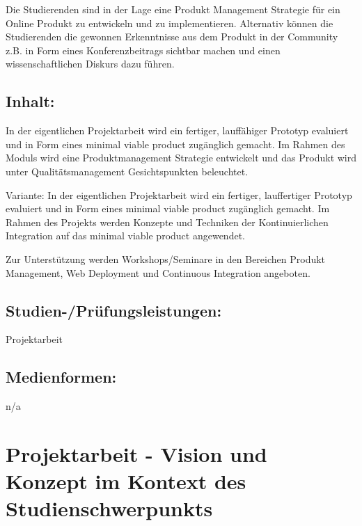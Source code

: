 Die Studierenden sind in der Lage eine Produkt Management Strategie für
ein Online Produkt zu entwickeln und zu implementieren. Alternativ
können die Studierenden die gewonnen Erkenntnisse aus dem Produkt in der
Community z.B. in Form eines Konferenzbeitrags sichtbar machen und einen
wissenschaftlichen Diskurs dazu führen.

\section*{Inhalt:}\label{inhalt-9}

In der eigentlichen Projektarbeit wird ein fertiger, lauffähiger
Prototyp evaluiert und in Form eines minimal viable product zugänglich
gemacht. Im Rahmen des Moduls wird eine Produktmanagement Strategie
entwickelt und das Produkt wird unter Qualitätsmanagement
Gesichtspunkten beleuchtet.

Variante: In der eigentlichen Projektarbeit wird ein fertiger,
lauffertiger Prototyp evaluiert und in Form eines minimal viable product
zugänglich gemacht. Im Rahmen des Projekts werden Konzepte und Techniken
der Kontinuierlichen Integration auf das minimal viable product
angewendet.

Zur Unterstützung werden Workshops/Seminare in den Bereichen Produkt
Management, Web Deployment und Continuous Integration angeboten.

\section*{Studien-/Prüfungsleistungen:}\label{studien-pruxfcfungsleistungen-9}

Projektarbeit

\section*{Medienformen:}\label{medienformen-9}

n/a

\chapter{Projektarbeit - Vision und Konzept im Kontext des
Studienschwerpunkts}\label{projektarbeit---vision-und-konzept-im-kontext-des-studienschwerpunkts}

